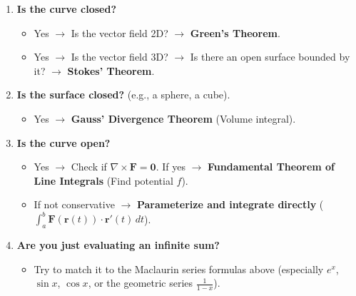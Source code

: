 \documentclass[11pt]{article}
\newcommand{\F}{\mathbf{F}}
\newcommand{\curl}{\nabla \times}
\begin{document}
\begin{enumerate}
    \item \textbf{Is the curve closed?}
    \begin{itemize}
        \item Yes $\to$ Is the vector field 2D? $\to$ \textbf{Green's Theorem}.
        \item Yes $\to$ Is the vector field 3D? $\to$ Is there an open surface bounded by it? $\to$ \textbf{Stokes' Theorem}.
    \end{itemize}
    \item \textbf{Is the surface closed?} (e.g., a sphere, a cube).
    \begin{itemize}
        \item Yes $\to$ \textbf{Gauss' Divergence Theorem} (Volume integral).
    \end{itemize}
    \item \textbf{Is the curve open?}
    \begin{itemize}
        \item Yes $\to$ Check if $\curl \F = \mathbf{0}$. If yes $\to$ \textbf{Fundamental Theorem of Line Integrals} (Find potential $f$).
        \item If not conservative $\to$ \textbf{Parameterize and integrate directly} ($\int_a^b \F(\mathbf{r}(t)) \cdot \mathbf{r}'(t) \, dt$).
    \end{itemize}
    \item \textbf{Are you just evaluating an infinite sum?}
    \begin{itemize}
        \item Try to match it to the Maclaurin series formulas above (especially $e^x$, $\sin x$, $\cos x$, or the geometric series $\frac{1}{1-x}$).
    \end{itemize}
\end{enumerate}
\end{document}
